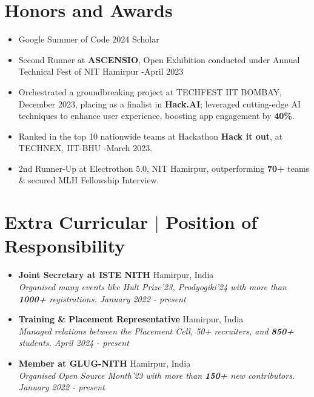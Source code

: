 \documentclass[legalpaper,10.5pt]{article}
\begin{document}
\section{Honors and Awards}
\begin{itemize}[leftmargin=*]
\item Google Summer of Code 2024 Scholar
\item Second Runner at \textbf{ASCENSIO}, Open Exhibition conducted under Annual Technical Fest of NIT Hamirpur -April 2023
\item Orchestrated a groundbreaking project at TECHFEST IIT BOMBAY, December 2023, placing as a finalist in \textbf{Hack.AI}; leveraged cutting-edge AI techniques to enhance user experience, boosting app engagement by \textbf{40\%}.
 \item Ranked in the top 10 nationwide teams at Hackathon \textbf{Hack it out}, at TECHNEX, IIT-BHU -March 2023.
\item {2nd Runner-Up at Electrothon 5.0, NIT Hamirpur, outperforming \textbf{70+} teams \& secured MLH Fellowship Interview.}
\end{itemize}

\section{Extra Curricular $|$ \normalsize{Position of Responsibility}}

\begin{itemize}[leftmargin=*, itemsep=0em]
    \item \textbf {Joint Secretary at ISTE NITH} \hfill Hamirpur, India\\
    \textit{Organised many events like Hult Prize'23, Prodyogiki'24 with more than \textbf{1000+} registrations. \hfill January 2022 - present}
    
    \item \textbf {Training \& Placement Representative} \hfill Hamirpur, India\\
    \textit{ \small Managed relations between the Placement Cell, 50+ recruiters, and \textbf{850+} students. \hfill April 2024 - present}
    
    \item \textbf{Member at GLUG-NITH} \hfill Hamirpur, India\\
    \textit {\small Organised Open Source Month'23 with more than \textbf{150+} new contributors. \hfill January 2022 - present} 
\end{itemize}
\end{document}
